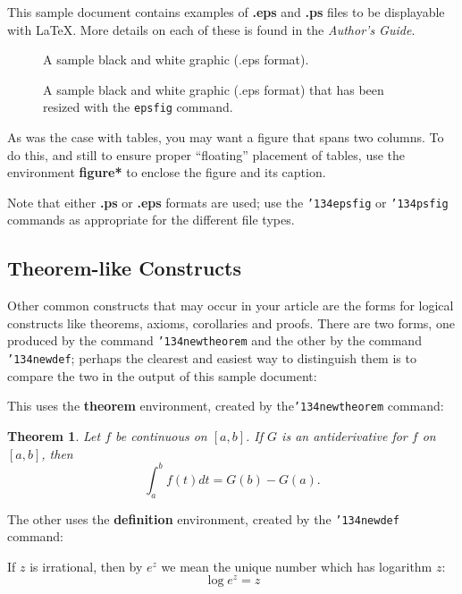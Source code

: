 \documentclass{acm_proc_article-sp}
\begin{document}
This sample document contains examples of \textbf{.eps}
and \textbf{.ps} files to be displayable with \LaTeX.  More
details on each of these is found in the \textit{Author's Guide}.

\begin{figure}
\centering
{}
\caption{A sample black and white graphic (.eps format).}
\end{figure}

\begin{figure}
\centering
{}
\caption{A sample black and white graphic (.eps format)
that has been resized with the \texttt{epsfig} command.}
\end{figure}


As was the case with tables, you may want a figure
that spans two columns.  To do this, and still to
ensure proper ``floating'' placement of tables, use the environment
\textbf{figure*} to enclose the figure and its caption.

Note that either {\textbf{.ps}} or {\textbf{.eps}} formats are
used; use
the \texttt{{\char'134}epsfig} or \texttt{{\char'134}psfig}
commands as appropriate for the different file types.

\subsection{Theorem-like Constructs}
Other common constructs that may occur in your article are
the forms for logical constructs like theorems, axioms,
corollaries and proofs.  There are
two forms, one produced by the
command \texttt{{\char'134}newtheorem} and the
other by the command \texttt{{\char'134}newdef}; perhaps
the clearest and easiest way to distinguish them is
to compare the two in the output of this sample document:

This uses the \textbf{theorem} environment, created by
the\linebreak\texttt{{\char'134}newtheorem} command:
\newtheorem{theorem}{Theorem}
\begin{theorem}
Let $f$ be continuous on $[a,b]$.  If $G$ is
an antiderivative for $f$ on $[a,b]$, then
\begin{displaymath}\int^b_af(t)dt = G(b) - G(a).\end{displaymath}
\end{theorem}

The other uses the \textbf{definition} environment, created
by the \texttt{{\char'134}newdef} command:
\begin{definition}
If $z$ is irrational, then by $e^z$ we mean the
unique number which has
logarithm $z$: \begin{displaymath}{\log e^z = z}\end{displaymath}
\end{definition}
\end{document}

